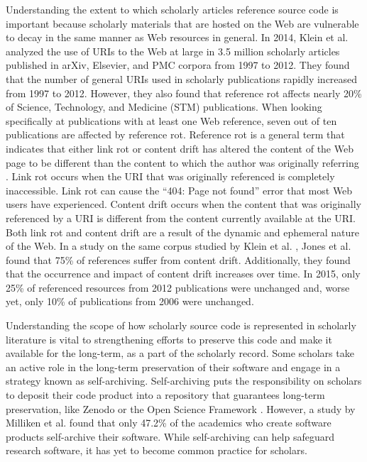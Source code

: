 Understanding the extent to which scholarly articles reference source code is important because scholarly materials that are hosted on the Web are vulnerable to decay in the same manner as Web resources in general. In 2014, Klein et al. \cite{klein-plos2014} analyzed the use of URIs to the Web at large in 3.5 million scholarly articles published in arXiv, Elsevier, and PMC corpora from 1997 to 2012. They found that the number of general URIs used in scholarly publications rapidly increased from 1997 to 2012. However, they also found that reference rot affects nearly 20\% of Science, Technology, and Medicine (STM) publications. When looking specifically at publications with at least one Web reference, seven out of ten publications are affected by reference rot. Reference rot is a general term that indicates that either link rot or content drift has altered the content of the Web page to be different than the content to which the author was originally referring \cite{vandesompel-icm2014}. Link rot occurs when the URI that was originally referenced is completely inaccessible. Link rot can cause the ``404: Page not found'' error that most Web users have experienced. Content drift occurs when the content that was originally referenced by a URI is different from the content currently available at the URI. Both link rot and content drift are a result of the dynamic and ephemeral nature of the Web. In a study on the same corpus studied by Klein et al. \cite{klein-plos2014}, Jones et al. \cite{jones-plos2016} found that 75\% of references suffer from content drift. Additionally, they found that the occurrence and impact of content drift increases over time. In 2015, only 25\% of referenced resources from 2012 publications were unchanged and, worse yet, only 10\% of publications from 2006 were unchanged.


Understanding the scope of how scholarly source code is represented in scholarly literature is vital to strengthening efforts to preserve this code and make it available for the long-term, as a part of the scholarly record. Some scholars take an active role in the long-term preservation of their software and engage in a strategy known as self-archiving. Self-archiving puts the responsibility on scholars to deposit their code product into a repository that guarantees long-term preservation, like Zenodo \cite{peters_zenodo} or the Open Science Framework \cite{foster_osf}. However, a study by Milliken et al. \cite{iasge_enviro_scan} found that only 47.2\% of the academics who create software products self-archive their software. While self-archiving can help safeguard research software, it has yet to become common practice for scholars.

